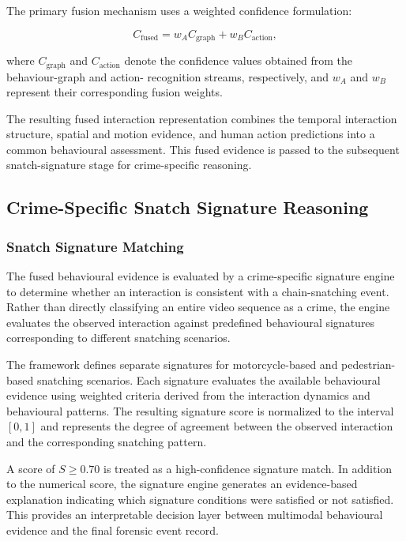 \documentclass[runningheads]{llncs}
\begin{document}
The primary fusion mechanism uses a weighted confidence formulation:

\begin{equation}
C_{\mathrm{fused}} =
w_A C_{\mathrm{graph}} +
w_B C_{\mathrm{action}},
\end{equation}

where $C_{\mathrm{graph}}$ and $C_{\mathrm{action}}$ denote the
confidence values obtained from the behaviour-graph and action-
recognition streams, respectively, and $w_A$ and $w_B$ represent their
corresponding fusion weights.

The resulting fused interaction representation combines the temporal
interaction structure, spatial and motion evidence, and human action
predictions into a common behavioural assessment. This fused evidence is
passed to the subsequent snatch-signature stage for crime-specific
reasoning.

\subsection{Crime-Specific Snatch Signature Reasoning}

\subsubsection{Snatch Signature Matching}

The fused behavioural evidence is evaluated by a crime-specific signature
engine to determine whether an interaction is consistent with a
chain-snatching event. Rather than directly classifying an entire video
sequence as a crime, the engine evaluates the observed interaction
against predefined behavioural signatures corresponding to different
snatching scenarios.

The framework defines separate signatures for motorcycle-based and
pedestrian-based snatching scenarios. Each signature evaluates the
available behavioural evidence using weighted criteria derived from the
interaction dynamics and behavioural patterns. The resulting signature
score is normalized to the interval $[0,1]$ and represents the degree of
agreement between the observed interaction and the corresponding
snatching pattern.

A score of $S \geq 0.70$ is treated as a high-confidence signature
match. In addition to the numerical score, the signature engine
generates an evidence-based explanation indicating which signature
conditions were satisfied or not satisfied. This provides an
interpretable decision layer between multimodal behavioural evidence and
the final forensic event record.
\end{document}
